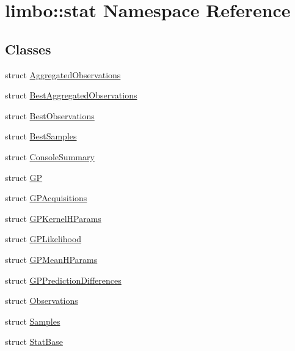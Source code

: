 \hypertarget{namespacelimbo_1_1stat}{}\section{limbo\+:\+:stat Namespace Reference}
\label{namespacelimbo_1_1stat}
\subsection*{Classes}
\begin{DoxyCompactItemize}
\item 
struct \hyperlink{structlimbo_1_1stat_1_1_aggregated_observations}{Aggregated\+Observations}
\item 
struct \hyperlink{structlimbo_1_1stat_1_1_best_aggregated_observations}{Best\+Aggregated\+Observations}
\item 
struct \hyperlink{structlimbo_1_1stat_1_1_best_observations}{Best\+Observations}
\item 
struct \hyperlink{structlimbo_1_1stat_1_1_best_samples}{Best\+Samples}
\item 
struct \hyperlink{structlimbo_1_1stat_1_1_console_summary}{Console\+Summary}
\item 
struct \hyperlink{structlimbo_1_1stat_1_1_g_p}{G\+P}
\item 
struct \hyperlink{structlimbo_1_1stat_1_1_g_p_acquisitions}{G\+P\+Acquisitions}
\item 
struct \hyperlink{structlimbo_1_1stat_1_1_g_p_kernel_h_params}{G\+P\+Kernel\+H\+Params}
\item 
struct \hyperlink{structlimbo_1_1stat_1_1_g_p_likelihood}{G\+P\+Likelihood}
\item 
struct \hyperlink{structlimbo_1_1stat_1_1_g_p_mean_h_params}{G\+P\+Mean\+H\+Params}
\item 
struct \hyperlink{structlimbo_1_1stat_1_1_g_p_prediction_differences}{G\+P\+Prediction\+Differences}
\item 
struct \hyperlink{structlimbo_1_1stat_1_1_observations}{Observations}
\item 
struct \hyperlink{structlimbo_1_1stat_1_1_samples}{Samples}
\item 
struct \hyperlink{structlimbo_1_1stat_1_1_stat_base}{Stat\+Base}
\end{DoxyCompactItemize}
